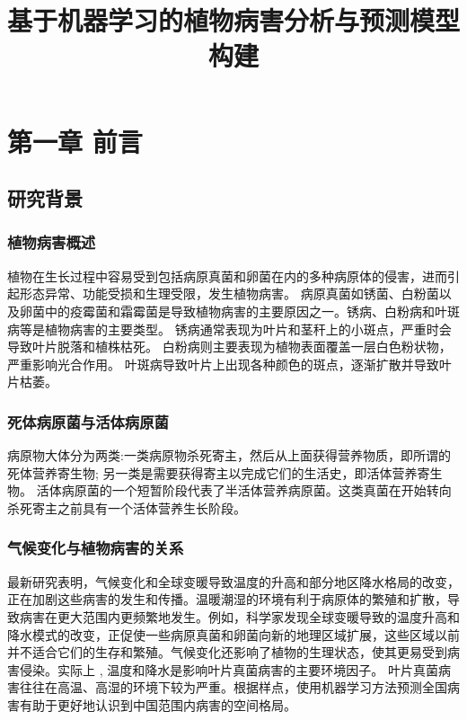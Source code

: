 \documentclass{article}
\title{基于机器学习的植物病害分析与预测模型构建}
\author{}
\date{}
\begin{document}
	
	\maketitle
	
	\tableofcontents
	
	\section{第一章 前言}
	\subsection{研究背景}
	\subsubsection{植物病害概述}
	
	植物在生长过程中容易受到包括病原真菌和卵菌在内的多种病原体的侵害，进而引起形态异常、功能受损和生理受限，发生植物病害。
	病原真菌如锈菌、白粉菌以及卵菌中的疫霉菌和霜霉菌是导致植物病害的主要原因之一。锈病、白粉病和叶斑病等是植物病害的主要类型。
	锈病通常表现为叶片和茎秆上的小斑点，严重时会导致叶片脱落和植株枯死。
	白粉病则主要表现为植物表面覆盖一层白色粉状物，严重影响光合作用。
	叶斑病导致叶片上出现各种颜色的斑点，逐渐扩散并导致叶片枯萎。
	
	\subsubsection{ 死体病原菌与活体病原菌}
	病原物大体分为两类:一类病原物杀死寄主，然后从上面获得营养物质，即所谓的死体营养寄生物; 另一类是需要获得寄主以完成它们的生活史，即活体营养寄生物。 活体病原菌的一个短暂阶段代表了半活体营养病原菌。这类真菌在开始转向杀死寄主之前具有一个活体营养生长阶段。
	
	\subsubsection{气候变化与植物病害的关系}
	
	最新研究表明，气候变化和全球变暖导致温度的升高和部分地区降水格局的改变，正在加剧这些病害的发生和传播。温暖潮湿的环境有利于病原体的繁殖和扩散，导致病害在更大范围内更频繁地发生。例如，科学家发现全球变暖导致的温度升高和降水模式的改变，正促使一些病原真菌和卵菌向新的地理区域扩展，这些区域以前并不适合它们的生存和繁殖。气候变化还影响了植物的生理状态，使其更易受到病害侵染。实际上 , 温度和降水是影响叶片真菌病害的主要环境因子。 叶片真菌病害往往在高温、高湿的环境下较为严重。根据样点，使用机器学习方法预测全国病害有助于更好地认识到中国范围内病害的空间格局。
	
\end{document}
